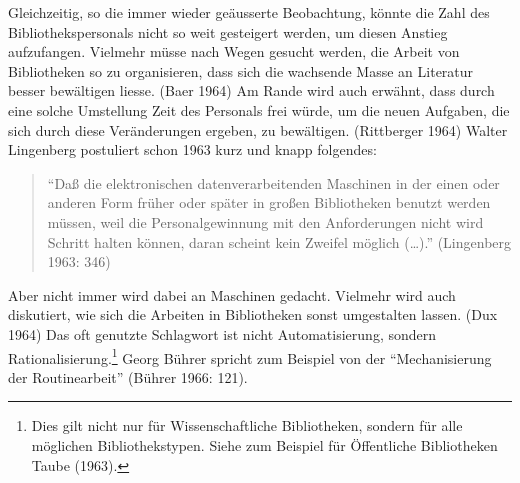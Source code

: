 \documentclass[a4paper,
fontsize=11pt,
oneside,
numbers=noperiodatend,
parskip=half-,
bibliography=totoc,
final
]{scrartcl}
\begin{document}
Gleichzeitig, so die immer wieder geäusserte Beobachtung, könnte die
Zahl des Bibliothekspersonals nicht so weit gesteigert werden, um diesen
Anstieg aufzufangen. Vielmehr müsse nach Wegen gesucht werden, die
Arbeit von Bibliotheken so zu organisieren, dass sich die wachsende
Masse an Literatur besser bewältigen liesse. (Baer 1964) Am Rande wird
auch erwähnt, dass durch eine solche Umstellung Zeit des Personals frei
würde, um die neuen Aufgaben, die sich durch diese Veränderungen
ergeben, zu bewältigen. (Rittberger 1964) Walter Lingenberg postuliert
schon 1963 kurz und knapp folgendes:

\begin{quote}
\enquote{Daß die elektronischen datenverarbeitenden Maschinen in der einen oder
anderen Form früher oder später in großen Bibliotheken benutzt werden
müssen, weil die Personalgewinnung mit den Anforderungen nicht wird
Schritt halten können, daran scheint kein Zweifel möglich (\ldots).}
(Lingenberg 1963: 346)
\end{quote}

Aber nicht immer wird dabei an Maschinen gedacht. Vielmehr wird auch
diskutiert, wie sich die Arbeiten in Bibliotheken sonst umgestalten
lassen. (Dux 1964) Das oft genutzte Schlagwort ist nicht
Automatisierung, sondern Rationalisierung.\footnote{Dies gilt nicht nur
  für Wissenschaftliche Bibliotheken, sondern für alle möglichen
  Bibliothekstypen. Siehe zum Beispiel für Öffentliche Bibliotheken
  Taube (1963).} Georg Bührer spricht zum Beispiel von der
\enquote{Mechanisierung der Routinearbeit} (Bührer 1966: 121).
\end{document}

